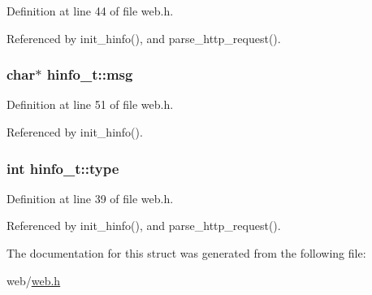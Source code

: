 Definition at line 44 of file web.\+h.



Referenced by init\+\_\+hinfo(), and parse\+\_\+http\+\_\+request().

\subsubsection[{\texorpdfstring{msg}{msg}}]{\setlength{\rightskip}{0pt plus 5cm}char$\ast$ hinfo\+\_\+t\+::msg}\hypertarget{structhinfo__t_a06469570091ad74724457998e07d5b56}{}\label{structhinfo__t_a06469570091ad74724457998e07d5b56}


Definition at line 51 of file web.\+h.



Referenced by init\+\_\+hinfo().

\subsubsection[{\texorpdfstring{type}{type}}]{\setlength{\rightskip}{0pt plus 5cm}int hinfo\+\_\+t\+::type}\hypertarget{structhinfo__t_a4e896141431943909a71282fc56799fb}{}\label{structhinfo__t_a4e896141431943909a71282fc56799fb}


Definition at line 39 of file web.\+h.



Referenced by init\+\_\+hinfo(), and parse\+\_\+http\+\_\+request().



The documentation for this struct was generated from the following file\+:\begin{DoxyCompactItemize}
\item 
web/\hyperlink{web_8h}{web.\+h}\end{DoxyCompactItemize}
